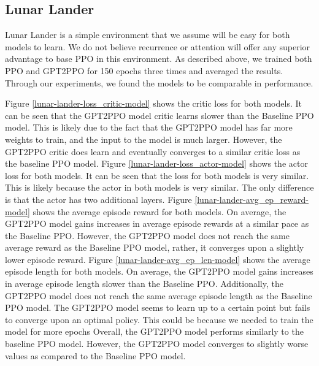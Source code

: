 \subsection{Lunar Lander}

Lunar Lander is a simple environment that we assume will be easy for both models to learn.
We do not believe recurrence or attention will offer any superior advantage to base PPO in this environment.
As described above, we trained both PPO and GPT2PPO for 150 epochs three times and averaged the results.
Through our experiments, we found the models to be comparable in performance.

Figure \ref{lunar-lander-loss_critic-model} shows the critic loss for both models. It can be seen that the GPT2PPO model critic learns
slower than the Baseline PPO model. This is likely due to the fact that the GPT2PPO model has far more weights to train, and the input to the model
is much larger. However, the GPT2PPO critic does learn and eventually converges to a similar critic loss as the baseline PPO model.
Figure \ref{lunar-lander-loss_actor-model} shows the actor loss for both models. It can be seen that the loss for both models is very similar.
This is likely because the actor in both models is very similar. The only difference is that the actor has two additional layers.
Figure \ref{lunar-lander-avg_ep_reward-model} shows the average episode reward for both models. On average, the GPT2PPO model gains increases in average
episode rewards at a similar pace as the Baseline PPO. However, the GPT2PPO model does not reach the same average reward as the Baseline PPO model, rather,
it converges upon a slightly lower episode reward.
Figure \ref{lunar-lander-avg_ep_len-model} shows the average episode length for both models. On average, the GPT2PPO model gains increases in average
episode length slower than the Baseline PPO. Additionally, the GPT2PPO model does not reach the same average episode length as the Baseline PPO model.
The GPT2PPO model seems to learn up to a certain point but fails to converge upon an optimal policy. This could be because we needed to train the model
for more epochs
Overall, the GPT2PPO model performs similarly to the baseline PPO model. However, the GPT2PPO model converges to slightly worse values as compared to the
Baseline PPO model.

